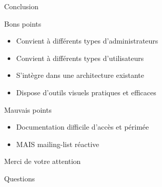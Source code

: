 \documentclass{beamer}
\begin{document}
\begin{frame}{Conclusion}
    \begin{block}{Bons points}
        \begin{itemize}
        \item Convient à différents types d'administrateurs %
        \item Convient à différents types d'utilisateurs %
        \item S'intègre dans une architecture existante
        \item Dispose d'outils visuels pratiques et efficaces
    \end{itemize}
        
    \end{block}

    \begin{alertblock}{Mauvais points}
    \begin{itemize}
        \item Documentation difficile d'accès et périmée
        \item MAIS mailing-list réactive
    \end{itemize}
        
    \end{alertblock}

\end{frame}


\begin{frame}
	\begin{center}	{\huge Merci de votre attention}\end{center}
	\end{frame}
\begin{frame}
	\begin{center}	{\huge Questions}\end{center}
	\end{frame}
\end{document}
